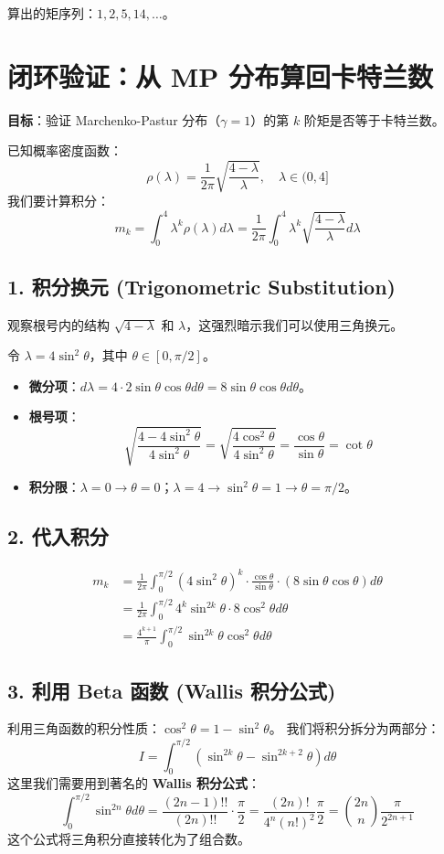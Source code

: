 \documentclass[11pt,a4paper]{ctexart}
\theoremstyle{definition}
\theoremstyle{remark}
\begin{document}
算出的矩序列：$1, 2, 5, 14, \dots$。

\section{闭环验证：从 MP 分布算回卡特兰数}

\textbf{目标}：验证 Marchenko-Pastur 分布（$\gamma=1$）的第 $k$ 阶矩是否等于卡特兰数。

已知概率密度函数：
\[
\rho(\lambda) = \frac{1}{2\pi} \sqrt{\frac{4-\lambda}{\lambda}}, \quad \lambda \in (0, 4]
\]
我们要计算积分：
\[
m_k = \int_0^4 \lambda^k \rho(\lambda) d\lambda = \frac{1}{2\pi} \int_0^4 \lambda^k \sqrt{\frac{4-\lambda}{\lambda}} d\lambda
\]

\subsection{1. 积分换元 (Trigonometric Substitution)}
观察根号内的结构 $\sqrt{4-\lambda}$ 和 $\lambda$，这强烈暗示我们可以使用三角换元。

令 $\lambda = 4 \sin^2 \theta$，其中 $\theta \in [0, \pi/2]$。
\begin{itemize}
    \item \textbf{微分项}：$d\lambda = 4 \cdot 2\sin\theta \cos\theta d\theta = 8 \sin\theta \cos\theta d\theta$。
    \item \textbf{根号项}：
    \[
    \sqrt{\frac{4 - 4\sin^2\theta}{4\sin^2\theta}} = \sqrt{\frac{4\cos^2\theta}{4\sin^2\theta}} = \frac{\cos\theta}{\sin\theta} = \cot\theta
    \]
    \item \textbf{积分限}：$\lambda=0 \to \theta=0$；$\lambda=4 \to \sin^2\theta=1 \to \theta=\pi/2$。
\end{itemize}

\subsection{2. 代入积分}
\[
\begin{aligned}
m_k &= \frac{1}{2\pi} \int_0^{\pi/2} (4\sin^2\theta)^k \cdot \frac{\cos\theta}{\sin\theta} \cdot (8\sin\theta\cos\theta) d\theta \\
&= \frac{1}{2\pi} \int_0^{\pi/2} 4^k \sin^{2k}\theta \cdot 8 \cos^2\theta d\theta \\
&= \frac{4^{k+1}}{\pi} \int_0^{\pi/2} \sin^{2k}\theta \cos^2\theta d\theta
\end{aligned}
\]

\subsection{3. 利用 Beta 函数 (Wallis 积分公式)}
利用三角函数的积分性质：$\cos^2\theta = 1 - \sin^2\theta$。
我们将积分拆分为两部分：
\[
I = \int_0^{\pi/2} (\sin^{2k}\theta - \sin^{2k+2}\theta) d\theta
\]
这里我们需要用到著名的 \textbf{Wallis 积分公式}：
\[
\int_0^{\pi/2} \sin^{2n}\theta d\theta = \frac{(2n-1)!!}{(2n)!!} \cdot \frac{\pi}{2} = \frac{(2n)!}{4^n (n!)^2} \frac{\pi}{2} = \binom{2n}{n} \frac{\pi}{2^{2n+1}}
\]
这个公式将三角积分直接转化为了组合数。
\end{document}
